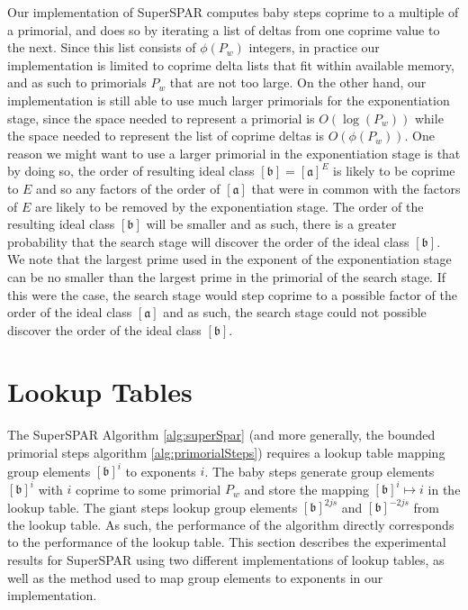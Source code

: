 \documentclass{ucalgthes1}
\theoremstyle{definition}
\newcommand{\ideal}{\mathfrak}
\newcommand{\idealclass}[1]{\left[ \ideal #1 \right]}
\newcommand{\aclass}{\idealclass a}
\newcommand{\bclass}{\idealclass b}
\begin{document}
Our implementation of SuperSPAR computes baby steps coprime to a multiple of a primorial, and does so by iterating a list of deltas from one coprime value to the next.  Since this list consists of $\phi(P_w)$ integers, in practice our implementation is limited to coprime delta lists that fit within available memory, and as such to primorials $P_w$ that are not too large.  On the other hand, our implementation is still able to use much larger primorials for the exponentiation stage, since the space needed to represent a primorial is $O(\log(P_w))$ while the space needed to represent the list of coprime deltas is $O(\phi(P_w))$.  One reason we might want to use a larger primorial in the exponentiation stage is that by doing so, the order of resulting ideal class $\bclass = \aclass^E$ is likely to be coprime to $E$ and so any factors of the order of $\aclass$ that were in common with the factors of $E$ are likely to be removed by the exponentiation stage.  The order of the resulting ideal class $\bclass$ will be smaller and as such, there is a greater probability that the search stage will discover the order of the ideal class $\bclass$.  We note that the largest prime used in the exponent of the exponentiation stage can be no smaller than the largest prime in the primorial of the search stage.  If this were the case, the search stage would step coprime to a possible factor of the order of the ideal class $\aclass$ and as such, the search stage could not possible discover the order of the ideal class $\bclass$.


\section{Lookup Tables}
\label{sec:ssparHashing}

The SuperSPAR Algorithm \ref{alg:superSpar} (and more generally, the bounded primorial steps algorithm \ref{alg:primorialSteps}) requires a lookup table mapping group elements $\bclass^i$ to exponents $i$.  The baby steps generate group elements $\bclass^i$ with $i$ coprime to some primorial $P_w$ and store the mapping $\bclass^i \mapsto i$ in the lookup table. The giant steps lookup group elements $\bclass^{2js}$ and $\bclass^{-2js}$ from the lookup table.  As such, the performance of the algorithm directly corresponds to the performance of the lookup table.  This section describes the experimental results for SuperSPAR using two different implementations of lookup tables, as well as the method used to map group elements to exponents in our implementation.
\end{document}

